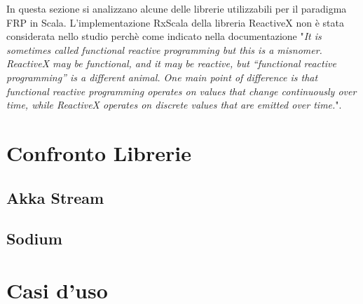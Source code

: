 \documentclass[../main.tex]{subfiles}
\begin{document}
In questa sezione si analizzano alcune delle librerie utilizzabili per il paradigma FRP in Scala. L'implementazione RxScala della libreria ReactiveX non è stata considerata nello studio perchè come indicato nella documentazione \cite{frp8} "\textit{It is sometimes called functional reactive programming but this is a misnomer. ReactiveX may be functional, and it may be reactive, but “functional reactive programming” is a different animal. One main point of difference is that functional reactive programming operates on values that change continuously over time, while ReactiveX operates on discrete values that are emitted over time.}".

\section{Confronto Librerie}
\subsection{Akka Stream}
\subsection{Sodium}
\section{Casi d'uso}
\end{document}

